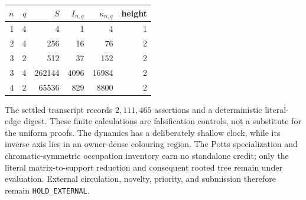 \documentclass[a4paper,10pt]{amsart}
\theoremstyle{remark}
\begin{document}
\begin{center}
\begin{tabular}{rrrrrr}
\toprule
$n$ & $q$ & $S$ & $I_{n,q}$ & $\kappa_{n,q}$ & height\\
\midrule
1 & 4 & 4      & 1    & 4     & 1\\
2 & 4 & 256    & 16   & 76    & 2\\
3 & 2 & 512    & 37   & 152   & 2\\
3 & 4 & 262144 & 4096 & 16984 & 2\\
4 & 2 & 65536  & 829  & 8800  & 2\\
\bottomrule
\end{tabular}
\end{center}

The settled transcript records $2{,}111{,}465$ assertions and a deterministic
literal-edge digest.  These finite calculations are falsification controls,
not a substitute for the uniform proofs.  The dynamics has a deliberately
shallow clock, while its inverse axis lies in an owner-dense colouring
region.  The Potts specialization and chromatic-symmetric occupation
inventory earn no standalone credit; only the literal matrix-to-support
reduction and consequent rooted tree remain under evaluation.  External
circulation, novelty, priority, and submission therefore remain
\texttt{HOLD\_EXTERNAL}.



\end{document}
